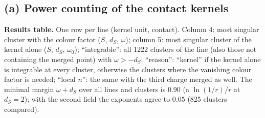 \subsection{(a) Power counting of the contact kernels}\label{sec:r3f-a}
\noindent\textbf{Results table.} One row per line (kernel unit, contact). Column 4: most singular cluster with the colour factor ($S$, $d_S$, $\omega$); column 5: most singular cluster of the kernel alone ($S$, $d_S$, $\omega_0$); ``integrable'': all 1222 clusters of the line (also those not containing the merged point) with $\omega>-d_S$; ``reason'': ``kernel'' if the kernel alone is integrable at every cluster, otherwise the clusters where the vanishing colour factor is needed; ``local $n$'': the same with the third charge merged as well. The minimal margin $\omega+d_S$ over all lines and clusters is $0.90$ (a $\ln(1/r)/r$ at $d_S=2$); with the second field the exponents agree to $0.05$ (825 clusters compared).
